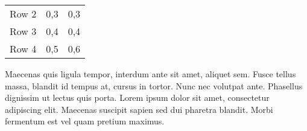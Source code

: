 \begin{longtable}[htbp]{@{}lll@{}}
\begin{minipage}[t]{0.1388888888888889\columnwidth}
Row 2\strut
\end{minipage} & \begin{minipage}[t]{0.16666666666666666\columnwidth}\raggedright
0,3\strut
\end{minipage} & \begin{minipage}[t]{0.1388888888888889\columnwidth}\raggedright
0,3\strut
\end{minipage}\tabularnewline\begin{minipage}[t]{0.1388888888888889\columnwidth}\raggedright
Row 3\strut
\end{minipage} & \begin{minipage}[t]{0.16666666666666666\columnwidth}\raggedright
0,4\strut
\end{minipage} & \begin{minipage}[t]{0.1388888888888889\columnwidth}\raggedright
0,4\strut
\end{minipage}\tabularnewline\begin{minipage}[t]{0.1388888888888889\columnwidth}\raggedright
Row 4\strut
\end{minipage} & \begin{minipage}[t]{0.16666666666666666\columnwidth}\raggedright
0,5\strut
\end{minipage} & \begin{minipage}[t]{0.1388888888888889\columnwidth}\raggedright
0,6\strut
\end{minipage}\tabularnewline
\bottomrule
\end{longtable}

Maecenas quis ligula tempor, interdum ante sit amet, aliquet sem.
Fusce tellus massa, blandit id tempus at, cursus in tortor. Nunc nec
volutpat ante. Phasellus dignissim ut lectus quis porta. Lorem ipsum
dolor sit amet, consectetur adipiscing elit. Maecenas suscipit
sapien sed dui pharetra blandit. Morbi fermentum est vel quam
pretium maximus.

